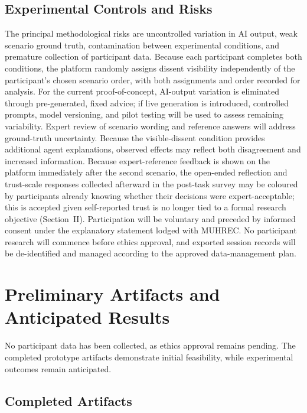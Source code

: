 \documentclass[conference]{IEEEtran}
\begin{document}
\subsection{Experimental Controls and Risks}

The principal methodological risks are uncontrolled variation in AI output, weak scenario ground truth, contamination between experimental conditions, and premature collection of participant data. Because each participant completes both conditions, the platform randomly assigns dissent visibility independently of the participant's chosen scenario order, with both assignments and order recorded for analysis. For the current proof-of-concept, AI-output variation is eliminated through pre-generated, fixed advice; if live generation is introduced, controlled prompts, model versioning, and pilot testing will be used to assess remaining variability. Expert review of scenario wording and reference answers will address ground-truth uncertainty. Because the visible-dissent condition provides additional agent explanations, observed effects may reflect both disagreement and increased information. Because expert-reference feedback is shown on the platform immediately after the second scenario, the open-ended reflection and trust-scale responses collected afterward in the post-task survey may be coloured by participants already knowing whether their decisions were expert-acceptable; this is accepted given self-reported trust is no longer tied to a formal research objective (Section~II). Participation will be voluntary and preceded by informed consent under the explanatory statement lodged with MUHREC. No participant research will commence before ethics approval, and exported session records will be de-identified and managed according to the approved data-management plan.





\section{Preliminary Artifacts and Anticipated Results}

No participant data has been collected, as ethics approval remains pending. The completed prototype artifacts demonstrate initial feasibility, while experimental outcomes remain anticipated.

\subsection{Completed Artifacts}
\end{document}
